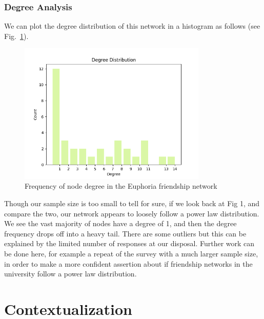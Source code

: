 \documentclass[runningheads]{llncs}
\begin{document}
\subsubsection{Degree Analysis} 
We can plot the degree distribution of this network in a histogram as follows (see Fig.~\ref{fig4}).

\begin{figure}
\begin{center}
\includegraphics[width=0.8\textwidth]{Project/fig4.png}
\caption{Frequency of node degree in the Euphoria friendship network} \label{fig4}
\end{center}
\end{figure}
\FloatBarrier
Though our sample size is too small to tell for sure, if we look back at Fig 1, and compare the two, our network appears to loosely follow a power law distribution. We see the vast majority of nodes have a degree of 1, and then the degree frequency drops off into a heavy tail. There are some outliers but this can be explained by the limited number of responses at our disposal. Further work can be done here, for example a repeat of the survey with a much larger sample size, in order to make a more confident assertion about if friendship networks in the university follow a power law distribution.


\section{Contextualization}
\end{document}

